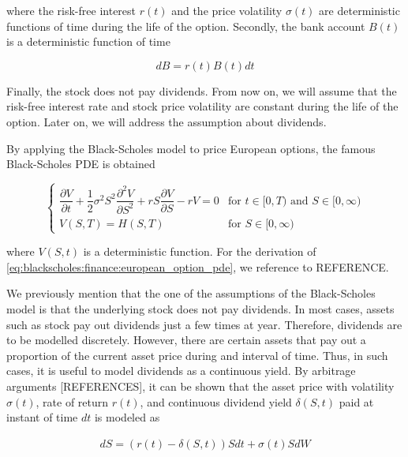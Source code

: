 where the risk-free interest $r(t)$ and the price volatility $\sigma(t)$ are 
deterministic functions of time during the life of the option. Secondly, the 
bank account $B(t)$ is a deterministic function of time

\begin{equation}
  dB = r(t)B(t)dt
\end{equation}

Finally, the stock does not pay dividends. From now on, we will assume that 
the risk-free interest rate and stock price volatility are constant during the 
life of the option. Later on, we will address the assumption about dividends.

By applying the Black-Scholes model to price European options, the famous Black-Scholes 
PDE is obtained

\begin{equation}
  \begin{cases}
    \dfrac{\partial{V}}{\partial{t}} + \dfrac{1}{2}\sigma^{2} S^2 \dfrac{\partial^2{V}}{\partial{S^2}} + r S \dfrac{\partial{V}}{\partial{S}} - rV = 0 & \text{for $t\in[0,T)$ and $S\in[0, \infty)$} \\
    V(S, T) = H(S, T) & \text{for $S\in[0, \infty)$}
  \end{cases}
  \label{eq:blackscholes:finance:european_option_pde}
\end{equation}

where $V(S, t)$ is a deterministic function. For the derivation of 
\eqref{eq:blackscholes:finance:european_option_pde}, we reference to REFERENCE.

We previously mention that the one of the assumptions of the Black-Scholes model is
that the underlying stock does not pay dividends. In most cases, assets such as stock
pay out dividends just a few times at year. Therefore, dividends are to be 
modelled discretely. However, there are certain assets that pay out a proportion
of the current asset price during and interval of time. Thus, in such cases, it is
useful to model dividends as a continuous yield. By arbitrage arguments [REFERENCES], it can be shown that the asset price with volatility $\sigma(t)$, rate of return $r(t)$,
and continuous dividend yield $\delta(S,t)$ paid at instant of time $dt$ is modeled as

\begin{align}
  dS = (r(t) - \delta(S, t))Sdt + \sigma(t) S dW
  \label{eq:blackscholes:finance:bs_price_model_with_dividends}
\end{align}

